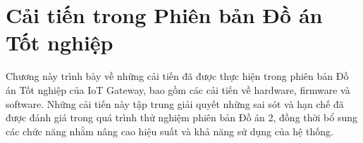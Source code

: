 ﻿\chapter{Cải tiến trong Phiên bản Đồ án Tốt nghiệp}
    Chương này trình bày về những cải tiến đã được thực hiện trong phiên bản Đồ án Tốt nghiệp của IoT Gateway, bao gồm các cải tiến về hardware, firmware và software. Những cải tiến này tập trung giải quyết những sai sót và hạn chế đã được đánh giá trong quá trình thử nghiệm phiên bản Đồ án 2, đồng thời bổ sung các chức năng nhằm nâng cao hiệu suất và khả năng sử dụng của hệ thống.
    
    
    
